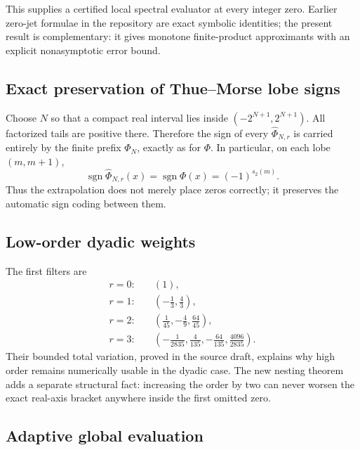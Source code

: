 \documentclass[11pt,oneside]{article}
\numberwithin{equation}{section}
\theoremstyle{frontier}
\theoremstyle{definition}
\theoremstyle{remark}
\newcommand{\sgn}{\operatorname{sgn}}
\newcommand{\wt}{s_2}
\begin{document}
This supplies a certified local spectral evaluator at every integer zero.  Earlier zero-jet
formulae in the repository are exact symbolic identities; the present result is complementary:
it gives monotone finite-product approximants with an explicit nonasymptotic error bound.

\subsection{Exact preservation of Thue--Morse lobe signs}

Choose $N$ so that a compact real interval lies inside $(-2^{N+1},2^{N+1})$.  All factorized
tails are positive there.  Therefore the sign of every $\widehat\Phi_{N,r}$ is carried
entirely by the finite prefix $\Phi_N$, exactly as for $\Phi$.  In particular, on each lobe
$(m,m+1)$,
\begin{equation}
 \sgn\widehat\Phi_{N,r}(x)=\sgn\Phi(x)=(-1)^{\wt(m)}.
 \label{eq:TM-sign-preserved}
\end{equation}
Thus the extrapolation does not merely place zeros correctly; it preserves the automatic
sign coding between them.

\subsection{Low-order dyadic weights}

The first filters are
\begin{align*}
 r=0:&\quad (1),\\
 r=1:&\quad \left(-\frac13,\frac43\right),\\
 r=2:&\quad \left(\frac1{45},-\frac49,\frac{64}{45}\right),\\
 r=3:&\quad \left(-\frac1{2835},\frac4{135},-\frac{64}{135},
                  \frac{4096}{2835}\right).
\end{align*}
Their bounded total variation, proved in the source draft, explains why high order remains
numerically usable in the dyadic case.  The new nesting theorem adds a separate structural
fact: increasing the order by two can never worsen the exact real-axis bracket anywhere
inside the first omitted zero.

\subsection{Adaptive global evaluation}
\end{document}
